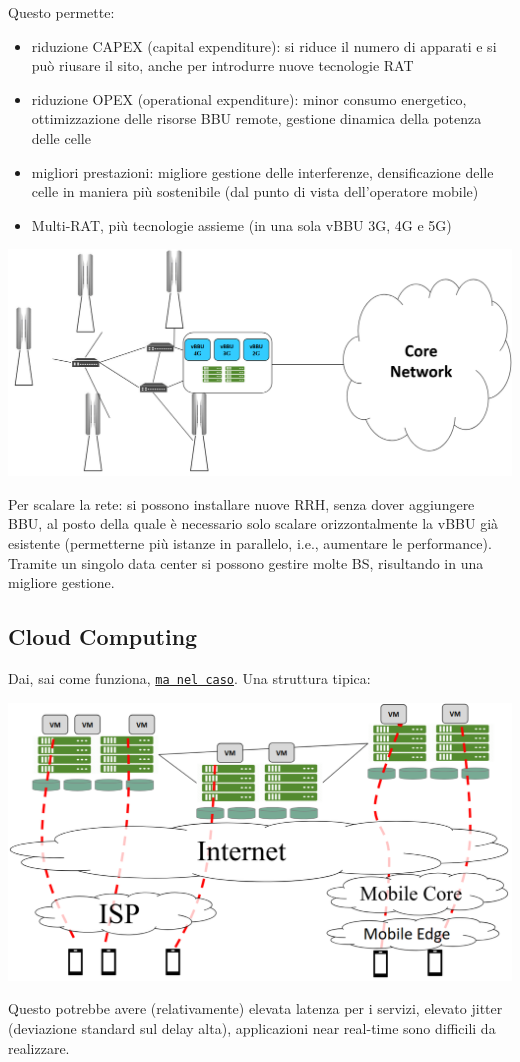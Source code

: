 Questo permette:
\begin{itemize}
	\item riduzione CAPEX (capital expenditure): si riduce il numero di apparati e si può riusare il sito, anche per introdurre nuove tecnologie RAT
	\item riduzione OPEX (operational expenditure): minor consumo energetico, ottimizzazione delle risorse BBU remote, gestione dinamica della potenza delle celle
	\item migliori prestazioni: migliore gestione delle interferenze, densificazione delle celle in maniera più sostenibile (dal punto di vista dell'operatore mobile)
	\item Multi-RAT, più tecnologie assieme (in una sola vBBU 3G, 4G e 5G)
\end{itemize}
\begin{center}
	\includegraphics[width=0.98\linewidth]{img/5g/vbbu}
\end{center}

Per scalare la rete: si possono installare nuove RRH, senza dover aggiungere BBU, al posto della quale è necessario solo scalare orizzontalmente la vBBU già esistente (permetterne più istanze in parallelo, i.e., aumentare le performance). Tramite un singolo data center si possono gestire molte BS, risultando in una migliore gestione.

\subsection*{Cloud Computing}
Dai, sai come funziona, \href{https://it.wikipedia.org/wiki/Cloud_computing}{\texttt{ma nel caso}}. Una struttura tipica:
\begin{center}
	\includegraphics[width=0.8\linewidth]{img/5g/clud}
\end{center}
Questo potrebbe avere (relativamente) elevata latenza per i servizi, elevato jitter (deviazione standard sul delay alta), applicazioni near real-time sono difficili da realizzare.

